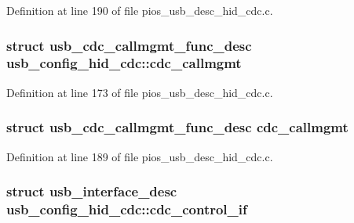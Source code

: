 \-Definition at line 190 of file pios\-\_\-usb\-\_\-desc\-\_\-hid\-\_\-cdc.\-c.

\hypertarget{group___p_i_o_s___u_s_b___d_e_s_c_ga1463830a390b3358935b4b39260c5762}{
\subsubsection[{cdc\-\_\-callmgmt}]{\setlength{\rightskip}{0pt plus 5cm}struct {\bf usb\-\_\-cdc\-\_\-callmgmt\-\_\-func\-\_\-desc} {\bf usb\-\_\-config\-\_\-hid\-\_\-cdc\-::cdc\-\_\-callmgmt}}}\label{group___p_i_o_s___u_s_b___d_e_s_c_ga1463830a390b3358935b4b39260c5762}


\-Definition at line 173 of file pios\-\_\-usb\-\_\-desc\-\_\-hid\-\_\-cdc.\-c.

\hypertarget{group___p_i_o_s___u_s_b___d_e_s_c_ga97d1e106c41e1670bffdc7505b67eaef}{
\subsubsection[{cdc\-\_\-callmgmt}]{\setlength{\rightskip}{0pt plus 5cm}struct {\bf usb\-\_\-cdc\-\_\-callmgmt\-\_\-func\-\_\-desc} {\bf cdc\-\_\-callmgmt}}}\label{group___p_i_o_s___u_s_b___d_e_s_c_ga97d1e106c41e1670bffdc7505b67eaef}


\-Definition at line 189 of file pios\-\_\-usb\-\_\-desc\-\_\-hid\-\_\-cdc.\-c.

\hypertarget{group___p_i_o_s___u_s_b___d_e_s_c_ga9cc4f55f507f420505ac9114cf7b9df3}{
\subsubsection[{cdc\-\_\-control\-\_\-if}]{\setlength{\rightskip}{0pt plus 5cm}struct {\bf usb\-\_\-interface\-\_\-desc} {\bf usb\-\_\-config\-\_\-hid\-\_\-cdc\-::cdc\-\_\-control\-\_\-if}}}\label{group___p_i_o_s___u_s_b___d_e_s_c_ga9cc4f55f507f420505ac9114cf7b9df3}


